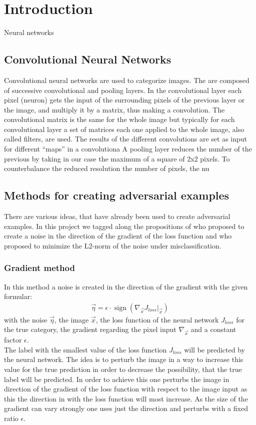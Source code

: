 \documentclass[%
 reprint,
 amsmath,amssymb,
 aps,
]{revtex4-1}
\begin{document}

\section{Introduction}

Neural networks 

\subsection{Convolutional Neural Networks}

Convolutional neural networks are used to categorize images. The are composed of successive convolutional and pooling layers. In the convolutional layer each pixel (neuron) gets the input of the surrounding pixels of the previous layer or the image, and multiply it by a matrix, thus making a convolution. The convolutional matrix is the same for the whole image but typically for each convolutional layer a set of matrices each one applied to the whole image, also called filters, are used. The results of the different convolutions are set as input for different ``maps'' in a convolutiona A pooling layer reduces the number of the previous by taking in our case the maximum of a square of 2x2 pixels. To counterbalance the reduced resolution the number of pixels, the nu

\subsection{Methods for creating adversarial examples}

There are various ideas, that have already been used to create adversarial examples. In this project we tagged along the propositions of \citeauthor{paperGrad} who proposed to create a noise in the direction of the gradient of the loss function and \citeauthor{paperMinimize} who proposed to minimize the L2-norm of the noise under misclassification.
\subsubsection*{Gradient method}
In this method a noise is created in the direction of the gradient with the given formular:
\begin{align*}
\vec{\eta} = \epsilon \cdot \operatorname{sign} \left( \nabla_{\vec{x}} J_{loss} \big \vert_{\vec{x}} \right) 
\end{align*}
with the noise $\vec{\eta}$, the image $\vec{x}$, the loss function of the neural network $J_{loss}$ for the true category, the gradient regarding the pixel input $\nabla_{\vec{x}}$ and a constant factor $\epsilon$.\\
The label with the smallest value of the loss function $J_{loss}$ will be predicted by the neural network. The idea is to perturb the image in a way to increase this value for the true prediction in order to decrease the possibility, that the true label will be predicted. In order to achieve this one perturbs the image in direction of the gradient of the loss function with respect to the image input as this the direction in with the loss function will most increase. As the size of the gradient can vary strongly one uses just the direction and perturbs with a fixed ratio $\epsilon$. \cite{paperGrad}
\end{document}

